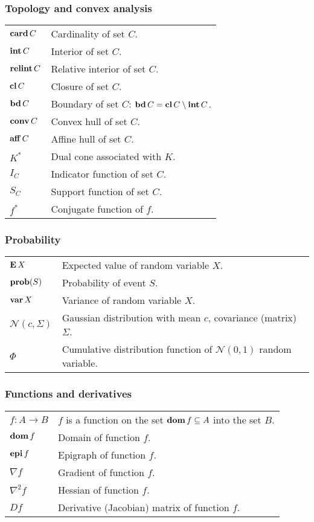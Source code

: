 \subsubsection*{Topology and convex analysis}
\begin{longtable}{p{}p{}}
    $\mathop{\bf card} C$ & Cardinality of set $C$.\\
    $\mathop{\bf int} C$ & Interior of set $C$.\\
    $\mathop{\bf relint} C$ & Relative interior of set $C$.\\
    $\mathop{\bf cl} C$ & Closure of set $C$.\\
    $\mathop{\bf bd} C$ & Boundary of set $C$: $\mathop{\bf bd} C = \mathop{\bf cl} C \setminus \mathop{\bf int} C$.\\
    $\mathop{\bf conv} C$ & Convex hull of set $C$.\\
    $\mathop{\bf aff} C$ & Affine hull of set $C$.\\
    $K^*$ & Dual cone associated with $K$.\\
    $I_C$ & Indicator function of set $C$.\\
    $S_C$ & Support function of set $C$.\\
    $f^*$ & Conjugate function of $f$.
\end{longtable}

\subsubsection*{Probability}
\begin{longtable}{p{}p{}}
    $\mathop{\bf E{}} X$ & Expected value of random variable $X$.\\
    $\mathop{\bf prob}(S)$ & Probability of event $S$.\\
    $\mathop{\bf var} X$ & Variance of random variable $X$.\\
    $\mathcal{N}(c, \Sigma)$ & Gaussian distribution with mean $c$, covariance (matrix) $\Sigma$.\\
    $\Phi$ & Cumulative distribution function of $\mathcal{N}(0, 1)$ random variable.\\
\end{longtable}

\subsubsection*{Functions and derivatives}
\begin{longtable}{p{}p{}}
    $f \colon A \to B$ & $f$ is a function on the set $\mathop{\bf dom} f \subseteq A$ into the set $B$.\\
    $\mathop{\bf dom} f$ & Domain of function $f$.\\
    $\mathop{\bf epi} f$ & Epigraph of function $f$.\\
    $\nabla f$ & Gradient of function $f$.\\
    $\nabla^2 f$ & Hessian of function $f$.\\
    $D f$ & Derivative (Jacobian) matrix of function $f$.\\
\end{longtable}
